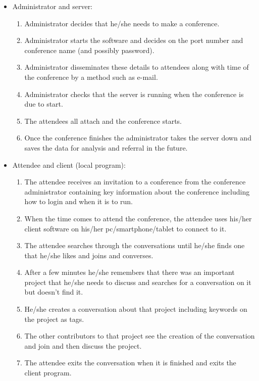 \documentclass[12p, a4paper, onecolumn]{report}
\begin{document}
\begin {itemize}
\item{Administrator and server:
\begin{enumerate}
\item Administrator decides that he/she needs to make a conference.
\item Administrator starts the software and decides on the port number and conference name (and possibly password).
\item Administrator disseminates these details to attendees along with time of the conference by a method such as e-mail.
\item Administrator checks that the server is running when the conference is due to start.
\item The attendees all attach and the conference starts.
\item Once the conference finishes the administrator takes the server down and saves the data for analysis and referral in the future.
\end{enumerate}}
 
\item{Attendee and client (local program):
\begin{enumerate}
\item The attendee receives an invitation to a conference from the conference administrator containing key information about the conference including how to login and when it is to run.
\item When the time comes to attend the conference, the attendee uses his/her client software on his/her pc/smartphone/tablet to connect to it.
\item The attendee searches through the conversations until he/she finds one that he/she likes and joins and converses.
\item After a few minutes he/she remembers that there was an important project that he/she needs to discuss and searches for a conversation on it but doesn’t find it.
\item He/she creates a conversation about that project including keywords on the project as tags.
\item The other contributors to that project see the creation of the conversation and join and then discuss the project.
\item The attendee exits the conversation when it is finished and exits the client program.
\end{enumerate}}
 

\end{itemize}
\end{document}
